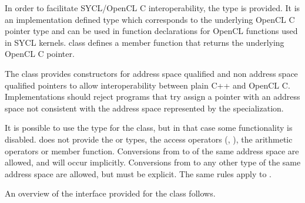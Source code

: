 In order to facilitate SYCL/OpenCL C
interoperability, the  type is provided. It is an
implementation defined type which corresponds to the underlying OpenCL C
pointer type and can be used in  function
declarations for OpenCL functions used in SYCL kernels.
 class defines a  member function that returns the underlying OpenCL C pointer.

The  class provides constructors for address space qualified and non address space qualified pointers to allow interoperability between plain C++ and OpenCL C.
Implementations should reject programs that try assign a pointer with an address space not consistent with the address space represented by the  specialization.

It is possible to use the  type for the 
class, but in that case some functionality is disabled.
 does not provide the  or
 types, the access operators
(, ), the arithmetic
operators or  member function.
Conversions from  to  of the
same address space are allowed, and will occur implicitly.
Conversions from  to any other
 type of the same address space
are allowed, but must be explicit.
The same rules apply to .

An overview of the interface provided for the  class
follows.


